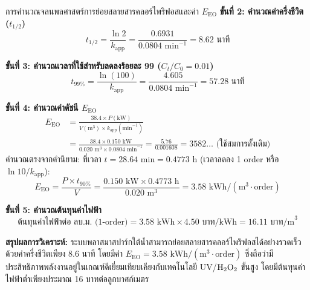 \begin{examplebox}{การคำนวณจลนพลศาสตร์การย่อยสลายสารคลอร์ไพริฟอสและค่า $E_{\text{EO}}$}
\textbf{ขั้นที่ 2: คำนวณค่าครึ่งชีวิต ($t_{1/2}$)}
\begin{equation*}
    t_{1/2} = \frac{\ln 2}{k_{\text{app}}} = \frac{0.6931}{0.0804 \text{ min}^{-1}} = 8.62 \text{ นาที}
\end{equation*}

\textbf{ขั้นที่ 3: คำนวณเวลาที่ใช้สำหรับลดลงร้อยละ 99 ($C_t/C_0 = 0.01$)}
\begin{equation*}
    t_{99\%} = \frac{\ln(100)}{k_{\text{app}}} = \frac{4.605}{0.0804 \text{ min}^{-1}} = 57.28 \text{ นาที}
\end{equation*}

\textbf{ขั้นที่ 4: คำนวณค่าดัชนี $E_{\text{EO}}$}
\begin{align*}
    E_{\text{EO}} &= \frac{38.4 \times P (\text{kW})}{V (\text{m}^3) \times k_{\text{app}} (\text{min}^{-1})} \\
    &= \frac{38.4 \times 0.150 \text{ kW}}{0.020 \text{ m}^3 \times 0.0804 \text{ min}^{-1}} = \frac{5.76}{0.001608} = 3582 \dots \text{ (ใช้สมการดั้งเดิม)}
\end{align*}
คำนวณตรงจากคำนิยาม: ที่เวลา $t = 28.64 \text{ min} = 0.4773 \text{ h}$ (เวลาลดลง 1 order หรือ $\ln 10 / k_{\text{app}}$):
\begin{equation*}
    E_{\text{EO}} = \frac{P \times t_{90\%}}{V} = \frac{0.150 \text{ kW} \times 0.4773 \text{ h}}{0.020 \text{ m}^3} = 3.58 \text{ kWh}/(\text{m}^3\cdot\text{order})
\end{equation*}

\textbf{ขั้นที่ 5: คำนวณต้นทุนค่าไฟฟ้า}
\begin{equation*}
    \text{ต้นทุนค่าไฟฟ้าต่อ ลบ.ม. (1-order)} = 3.58 \text{ kWh} \times 4.50 \text{ บาท/kWh} = 16.11 \text{ บาท/m}^3
\end{equation*}

\textbf{สรุปผลการวิเคราะห์:} ระบบพลาสมาสปาร์กใต้น้ำสามารถย่อยสลายสารคลอร์ไพริฟอสได้อย่างรวดเร็วด้วยค่าครึ่งชีวิตเพียง $8.6$ นาที โดยมีค่า $E_{\text{EO}} = 3.58 \text{ kWh}/(\text{m}^3\cdot\text{order})$ ซึ่งถือว่ามีประสิทธิภาพพลังงานอยู่ในเกณฑ์ดีเยี่ยมเทียบเคียงกับเทคโนโลยี UV/$\ce{H2O2}$ ขั้นสูง โดยมีต้นทุนค่าไฟฟ้าต่ำเพียงประมาณ 16 บาทต่อลูกบาศก์เมตร
\end{examplebox}

